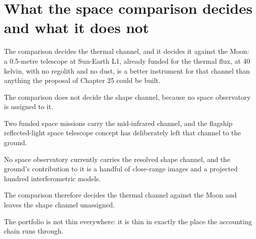 \section{What the space comparison decides and what it does not}

The comparison decides the thermal channel, and it decides it against the
Moon: a 0.5-metre telescope at Sun-Earth L1, already funded for the
thermal flux, at 40 kelvin, with no regolith and no dust, is a better
instrument for that channel than anything the proposal of Chapter 25 could
be built.

The comparison does not decide the shape channel, because no space
observatory is assigned to it.

\begin{keytakeaways}
\item Two funded space missions carry the mid-infrared channel, and the
flagship reflected-light space telescope concept has deliberately left that
channel to the ground.
\item No space observatory currently carries the resolved shape channel, and
the ground's contribution to it is a handful of close-range images and a
projected hundred interferometric models.
\item The comparison therefore decides the thermal channel against the Moon
and leaves the shape channel unassigned.
\item The portfolio is not thin everywhere: it is thin in exactly the place
the accounting chain runs through.
\end{keytakeaways}
